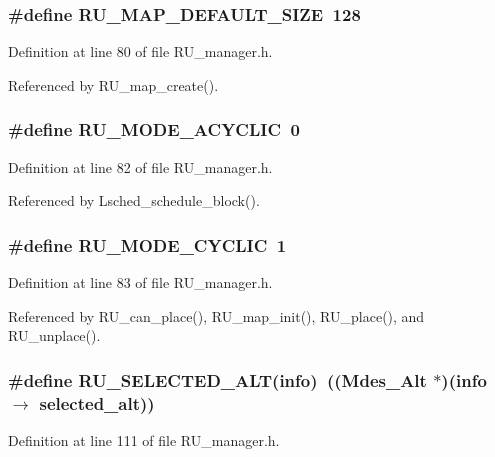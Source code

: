 \subsubsection{\setlength{\rightskip}{0pt plus 5cm}\#define RU\_\-MAP\_\-DEFAULT\_\-SIZE~128}\label{RU__manager_8h_92bab7a3c8cef64380203a8fde359883}




Definition at line 80 of file RU\_\-manager.h.

Referenced by RU\_\-map\_\-create().
\subsubsection{\setlength{\rightskip}{0pt plus 5cm}\#define RU\_\-MODE\_\-ACYCLIC~0}\label{RU__manager_8h_6877026a9baa7740de052ee6dcb9bdb5}




Definition at line 82 of file RU\_\-manager.h.

Referenced by Lsched\_\-schedule\_\-block().
\subsubsection{\setlength{\rightskip}{0pt plus 5cm}\#define RU\_\-MODE\_\-CYCLIC~1}\label{RU__manager_8h_e7963acf93fd18b28d3b2fd33a251f9f}




Definition at line 83 of file RU\_\-manager.h.

Referenced by RU\_\-can\_\-place(), RU\_\-map\_\-init(), RU\_\-place(), and RU\_\-unplace().
\subsubsection{\setlength{\rightskip}{0pt plus 5cm}\#define RU\_\-SELECTED\_\-ALT(info)~((Mdes\_\-Alt $\ast$)(info $\rightarrow$ selected\_\-alt))}\label{RU__manager_8h_6179092fd9ae50a6dced97a586d9d4ee}




Definition at line 111 of file RU\_\-manager.h.

